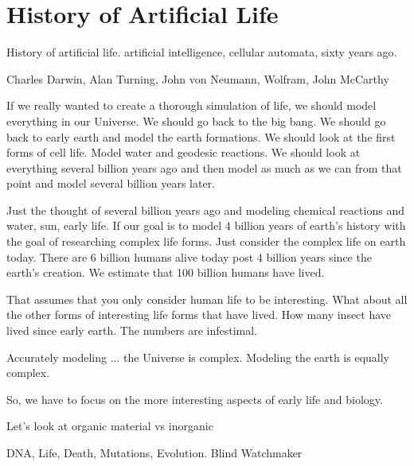
\section{History of Artificial Life}


History of artificial life.  artificial intelligence, cellular automata, sixty
years ago.

Charles Darwin, Alan Turning, John von Neumann, Wolfram, John McCarthy

If we really wanted to create a thorough simulation of life, we should model
everything in our Universe.  We should go back to the big bang.  We should go
back to early earth and model the earth formations.  We should look at the first
forms of cell life.  Model water and geodesic reactions.  We should look at
everything several billion years ago and then model as much as we can from that
point and model several billion years later.

Just the thought of several billion years ago and modeling chemical reactions
and water, sun, early life.  If our goal is to model 4 billion years of earth's
history with the goal of researching complex life forms.  Just consider the
complex life on earth today.  There are 6 billion humans alive today post 4
billion years since the earth's creation.  We estimate  that 100 billion humans
have lived.

That assumes that you only consider human life to be interesting.  What about
all the other forms of interesting life forms that have lived.  How many insect
have lived since early earth.  The numbers are infestimal.

Accurately modeling ... the Universe is complex.   Modeling the earth is equally
complex.

So, we have to focus on the more interesting aspects of early life and biology.

Let's look at organic material vs inorganic

DNA, Life, Death, Mutations, Evolution.  Blind Watchmaker